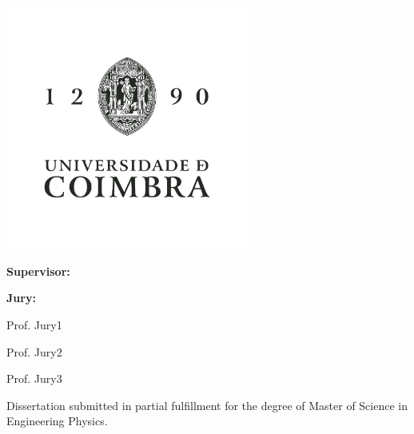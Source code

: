 \begin{titlepage}
    \begin{center}
    \includegraphics[width=0.6\textwidth]{images/UC_logos/UC_V_FundoClaro-negro.png}
    
    \vspace{0.8cm}
    {\Huge{\textbf{\thesistitle}}\par}
    
    \vspace{1cm}
    {\large{\textbf{Supervisor:}\\\supervisorname\par}}
    \vspace{5mm}
    
    \vspace{1cm}
    {\large{\textbf{Jury:}
    
    Prof. Jury1
    
    Prof. Jury2
    
    Prof. Jury3
    
    }}
    
    \vfill
    Dissertation submitted in partial fulfillment for the degree of Master of Science in Engineering Physics.
    
    \vspace{0.5cm}
    {\large \statedate\par}    
    
    
    \end{center}
\end{titlepage}